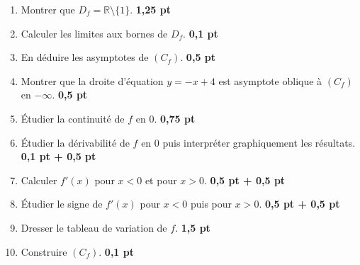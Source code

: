 \documentclass[12pt,a4paper]{article}
\begin{document}
\begin{enumerate}
    \item Montrer que \( D_f = \mathbb{R} \setminus \{1\} \). \hfill \textbf{1{,}25 pt}
    
    \item Calculer les limites aux bornes de \( D_f \). \hfill \textbf{0{,}1 pt}
    
    \item En déduire les asymptotes de \( (C_f) \). \hfill \textbf{0{,}5 pt}
    
    \item Montrer que la droite d’équation \( y = -x + 4 \) est asymptote oblique à \( (C_f) \) en \( -\infty \). \hfill \textbf{0{,}5 pt}
    
    \item Étudier la continuité de \( f \) en \( 0 \). \hfill \textbf{0{,}75 pt}
    
    \item Étudier la dérivabilité de \( f \) en \( 0 \) puis interpréter graphiquement les résultats. \hfill \textbf{0{,}1 pt + 0{,}5 pt}
    
    \item Calculer \( f'(x) \) pour \( x < 0 \) et pour \( x > 0 \). \hfill \textbf{0{,}5 pt + 0{,}5 pt}
    
    \item Étudier le signe de \( f'(x) \) pour \( x < 0 \) puis pour \( x > 0 \). \hfill \textbf{0{,}5 pt + 0{,}5 pt}
    
    \item Dresser le tableau de variation de \( f \). \hfill \textbf{1{,}5 pt}
    
    \item Construire \( (C_f) \). \hfill \textbf{0{,}1 pt}
\end{enumerate}
\end{document}
